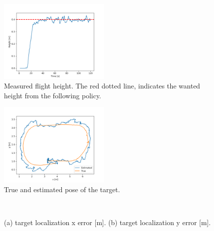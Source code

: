 \begin{figure}
    \centering
    \includegraphics[width=0.48\textwidth]{images/real_test/drone_height.png}
    \caption{Measured flight height. The red dotted line, indicates the wanted height from the following policy.}
    \label{REAL:fig:height}
\end{figure}

\begin{figure}
    \centering
    \includegraphics[width=0.48\textwidth]{images/real_test/tag_estim-real_pos.png}
    \caption{True and estimated pose of the target.}
    \label{REAL:fig:tag_estim}
\end{figure}

\begin{figure}[ht]
     \centering     
     \\
     \caption{(a) target localization x error [m]. (b) target localization y error [m].}
     \label{REAL:fig:loc_err}
\end{figure}